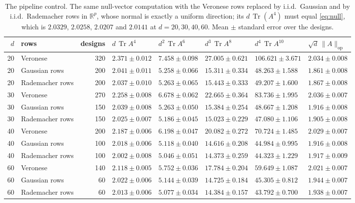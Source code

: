 \documentclass[11pt]{article}
\theoremstyle{definition}
\DeclareMathOperator{\Tr}{Tr}
\newcommand{\R}{\mathbb{R}}
\begin{document}
\begin{table}[t]
\centering\small
\caption{The pipeline control. The same null-vector computation with the Veronese rows replaced by
i.i.d.\ Gaussian and by i.i.d.\ Rademacher rows in $\R^p$, whose normal is exactly a uniform
direction; its $d\,\Tr(A^4)$ must equal \eqref{eq:null}, which is $2.0329$, $2.0258$, $2.0207$ and
$2.0141$ at $d=20,30,40,60$. Mean $\pm$ standard error over the designs.}
\label{tab:control}
{\footnotesize\setlength{\tabcolsep}{3pt}
\begin{tabular}{rlrlllll}
\toprule
$d$ & rows & designs & $d\,\Tr A^4$ & $d^2\,\Tr A^6$ & $d^3\,\Tr A^8$ & $d^4\,\Tr A^{10}$ &
$\sqrt d\,\|A\|_{\mathrm{op}}$\\
\midrule
20 & Veronese & 320 & $2.371\pm0.012$ & $7.458\pm0.098$ & $27.005\pm0.621$ & $106.621\pm3.671$ & $2.034\pm0.008$\\
20 & Gaussian rows & 200 & $2.041\pm0.011$ & $5.258\pm0.066$ & $15.311\pm0.334$ & $48.263\pm1.588$ & $1.861\pm0.008$\\
20 & Rademacher rows & 200 & $2.037\pm0.010$ & $5.263\pm0.065$ & $15.443\pm0.333$ & $49.207\pm1.600$ & $1.867\pm0.008$\\
30 & Veronese & 270 & $2.258\pm0.008$ & $6.678\pm0.062$ & $22.665\pm0.364$ & $83.736\pm1.995$ & $2.036\pm0.007$\\
30 & Gaussian rows & 150 & $2.039\pm0.008$ & $5.263\pm0.050$ & $15.384\pm0.254$ & $48.667\pm1.208$ & $1.916\pm0.008$\\
30 & Rademacher rows & 150 & $2.025\pm0.007$ & $5.186\pm0.045$ & $15.023\pm0.229$ & $47.080\pm1.106$ & $1.905\pm0.008$\\
40 & Veronese & 200 & $2.187\pm0.006$ & $6.198\pm0.047$ & $20.082\pm0.272$ & $70.724\pm1.485$ & $2.029\pm0.007$\\
40 & Gaussian rows & 100 & $2.018\pm0.006$ & $5.118\pm0.040$ & $14.616\pm0.208$ & $44.984\pm0.995$ & $1.916\pm0.008$\\
40 & Rademacher rows & 100 & $2.002\pm0.008$ & $5.046\pm0.051$ & $14.373\pm0.259$ & $44.323\pm1.229$ & $1.917\pm0.009$\\
60 & Veronese & 140 & $2.118\pm0.005$ & $5.752\pm0.036$ & $17.784\pm0.204$ & $59.649\pm1.087$ & $2.021\pm0.007$\\
60 & Gaussian rows & 60 & $2.022\pm0.006$ & $5.144\pm0.039$ & $14.725\pm0.184$ & $45.305\pm0.812$ & $1.944\pm0.007$\\
60 & Rademacher rows & 60 & $2.013\pm0.006$ & $5.077\pm0.034$ & $14.384\pm0.157$ & $43.792\pm0.700$ & $1.938\pm0.007$\\
\bottomrule
\end{tabular}}
\end{table}
\end{document}
